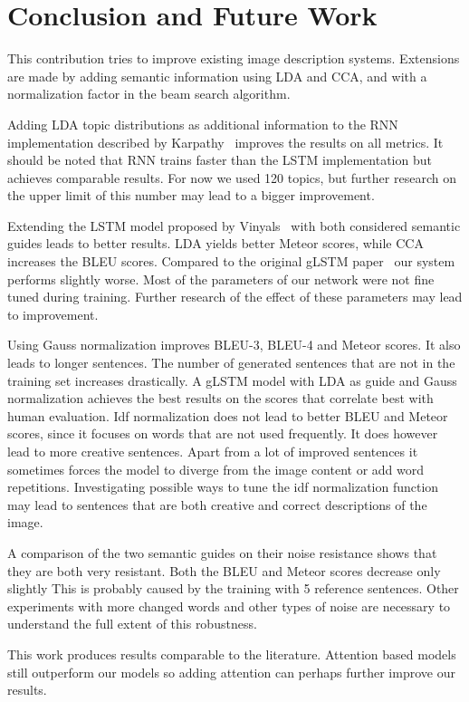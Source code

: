 \documentclass[twoside,twocolumn]{article}
\begin{document}
	\section{Conclusion and Future Work}
	This contribution tries to improve existing image description systems. Extensions are made by adding semantic information using LDA and CCA, and with a normalization factor in the beam search algorithm.
	
	Adding LDA topic distributions as additional information to the RNN implementation described by Karpathy~\cite{Karpathy2015} improves the results on all metrics. It should be noted that RNN trains faster than the LSTM implementation but achieves comparable results. For now we used 120 topics, but further research on the upper limit of this number may lead to a bigger improvement.
	
	Extending the LSTM model proposed by Vinyals~\cite{Google} with both considered semantic guides leads to better results. LDA yields better Meteor scores, while CCA increases the BLEU scores. Compared to the original gLSTM paper~\cite{Fernando2015} our system performs slightly worse. Most of the parameters of our network were not fine tuned during training. Further research of the effect of these parameters may lead to improvement.
	
	Using Gauss normalization improves BLEU-3, BLEU-4 and Meteor scores. It also leads to longer sentences. The number of generated sentences that are not in the training set increases drastically. A gLSTM model with LDA as guide and Gauss normalization achieves the best results on the scores that correlate best with human evaluation. Idf normalization does not lead to better BLEU and Meteor scores, since it focuses on words that are not used frequently. It does however lead to more creative sentences. Apart from a lot of improved sentences it sometimes forces the model to diverge from the image content or add word repetitions. Investigating possible ways to tune the idf normalization function may lead to sentences that are both creative and correct descriptions of the image.
	
	A comparison of the two semantic guides on their noise resistance shows that they are both very resistant. Both the BLEU and Meteor scores decrease only slightly This is probably caused by the training with 5 reference sentences. Other experiments with more changed words and other types of noise are necessary to understand the full extent of this robustness.
	
	This work produces results comparable to the literature. Attention based models still outperform our models so adding attention can perhaps further improve our results.
	
\end{document}
